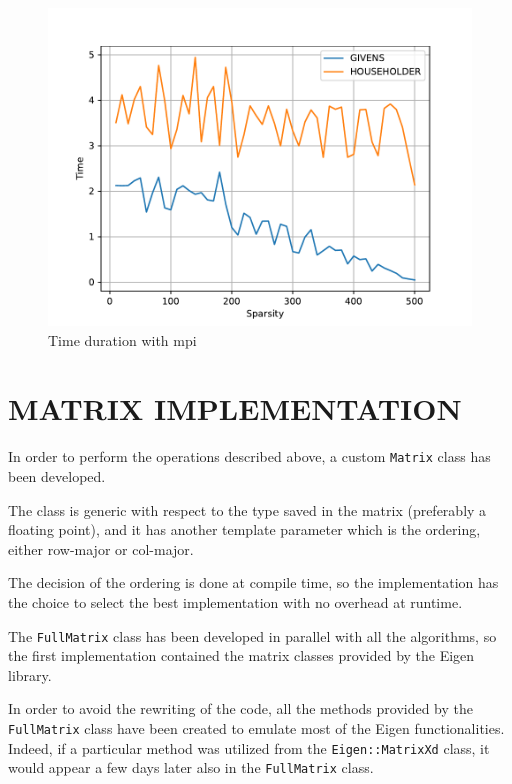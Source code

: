\documentclass{article}
\begin{document}
\begin{figure}[htbp]
\begin{minipage}{0.3\textwidth}
        \centering
        \includegraphics[width=\textwidth]{sparsity.pdf}
        \caption{Time duration with mpi}
        \label{fig:sparsity_test}
    \end{minipage}
\end{figure}








    
\newpage

\section{MATRIX IMPLEMENTATION}

In order to perform the operations described above, a custom \texttt{Matrix} class has been developed.

The class is generic with respect to the type saved in the matrix (preferably a floating point), and it has another template parameter which is the ordering, either row-major or col-major.

The decision of the ordering is done at compile time, so the implementation has the choice to select the best implementation with no overhead at runtime.

The \texttt{FullMatrix} class has been developed in parallel with all the algorithms, so the first implementation contained the matrix classes provided by the Eigen library.

In order to avoid the rewriting of the code, all the methods provided by the \texttt{FullMatrix} class have been created to emulate most of the Eigen functionalities. Indeed, if a particular method was utilized from the \texttt{Eigen::MatrixXd} class, it would appear a few days later also in the \texttt{FullMatrix} class.
\end{document}
